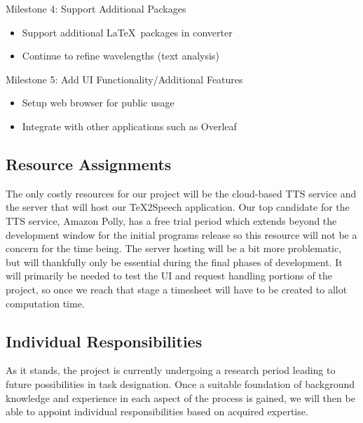 Milestone 4: Support Additional Packages
\begin{itemize}
    \itemsep0em
    \item Support additional \LaTeX\ packages in converter
    \item Continue to refine wavelengths (text analysis)
\end{itemize}
Milestone 5: Add UI Functionality/Additional Features
\begin{itemize}
    \itemsep0em
    \item Setup web browser for public usage
    \item Integrate with other applications such as Overleaf
\end{itemize}

\subsection{Resource Assignments}
%
The only costly resources for our project will be the cloud-based TTS service and the server that will host our \TeX 2Speech application. Our top candidate for the TTS service, Amazon Polly, has a free trial period which extends beyond the development window for the initial programs release so this resource will not be a concern for the time being. The server hosting will be a bit more problematic, but will thankfully only be essential during the final phases of development. It will primarily be needed to test the UI and request handling portions of the project, so once we reach that stage a timesheet will have to be created to allot computation time.
\subsection{Individual Responsibilities}
%
As it stands, the project is currently undergoing a research period leading to future possibilities in task designation. Once a suitable foundation of background knowledge and experience in each aspect of the process is gained, we will then be able to appoint individual responsibilities based on acquired expertise.